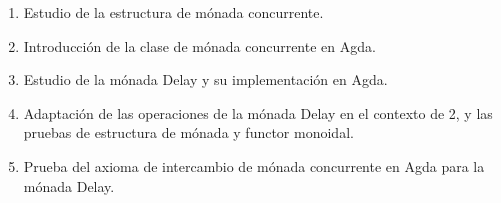 \documentclass[11pt,a4paper]{article}
\begin{document}
\begin{enumerate}

\item Estudio de la estructura de mónada concurrente.

\item Introducción de la clase de mónada concurrente en Agda.

\item Estudio de la mónada Delay y su implementación en Agda.

\item Adaptación de las operaciones de la mónada Delay en el contexto de
2, y las pruebas de estructura de mónada y functor monoidal.

\item Prueba del axioma de intercambio de mónada concurrente en Agda
para la mónada Delay.

\end{enumerate}



\end{document}
